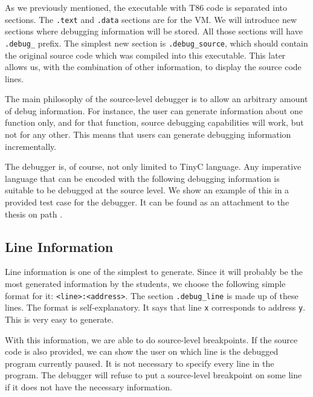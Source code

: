 As we previously mentioned, the executable with T86 code is separated into
sections. The \texttt{.text} and \texttt{.data} sections are for the VM. We
will introduce new sections where debugging information will be stored. All
those sections will have \verb|.debug_| prefix. The simplest new section is
\verb|.debug_source|, which should contain the original source code which was
compiled into this executable. This later allows us, with the combination of
other information, to display the source code lines.

The main philosophy of the source-level debugger is to allow an arbitrary
amount of debug information. For instance, the user can generate information
about one function only, and for that function, source debugging capabilities
will work, but not for any other. This means that users can generate debugging
information incrementally.

The debugger is, of course, not only limited to TinyC language. Any imperative
language that can be encoded with the following debugging information is
suitable to be debugged at the source level. We show an example of this in a
provided test case for the debugger. It can be found as an attachment to the
thesis on path .

\subsection{Line Information}
Line information is one of the simplest to generate. Since it will probably be
the most generated information by the students, we choose the following simple
format for it: \texttt{<line>:<address>}. The section \verb|.debug_line| is
made up of these lines. The format is self-explanatory. It says that line
\texttt{x} corresponds to address \texttt{y}. This is very easy to generate.

With this information, we are able to do source-level breakpoints. If the
source code is also provided, we can show the user on which line is the
debugged program currently paused. It is not necessary to specify every line in
the program. The debugger will refuse to put a source-level breakpoint on some
line if it does not have the necessary information.

